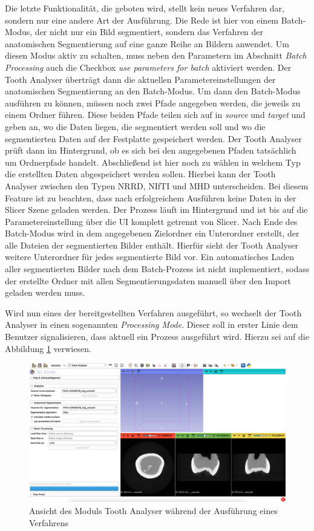 Die letzte Funktionalität, die geboten wird, stellt kein neues Verfahren dar, sondern
nur eine andere Art der Ausführung. Die Rede ist hier von einem Batch-Modus, der
nicht nur ein Bild segmentiert, sondern das Verfahren der anatomischen
Segmentierung auf eine ganze Reihe an Bildern anwendet. Um diesen Modus aktiv zu
schalten, muss neben den Parametern im Abschnitt \textit{Batch Processing} auch die
Checkbox \textit{use parameters for batch} aktiviert werden. Der Tooth Analyser überträgt
dann die aktuellen Parametereinstellungen der anatomischen Segmentierung an den Batch-Modus.
Um dann den Batch-Modus ausführen zu können, müssen noch zwei Pfade angegeben werden,
die jeweils zu einem Ordner führen. Diese beiden Pfade teilen sich auf in \textit{source}
und \textit{target} und geben an, wo die Daten liegen, die segmentiert werden soll
und wo die segmentierten Daten auf der Festplatte gespeichert werden. Der Tooth
Analyser prüft dann im Hintergrund, ob es sich bei den angegebenen Pfaden tatsächlich
um Ordnerpfade handelt. Abschließend ist hier noch zu wählen in welchem Typ die
erstellten Daten abgespeichert werden sollen. Hierbei kann der Tooth Analyser zwischen
den Typen \ac{NRRD}, \ac{NIfTI} und \ac{MHD} unterscheiden. Bei diesem Feature
ist zu beachten, dass nach erfolgreichem Ausführen keine Daten in der Slicer Szene
geladen werden. Der Prozess läuft im Hintergrund und ist bis auf die
Parametereinstellung über die \ac{UI} komplett getrennt von Slicer. Nach Ende
des Batch-Modus wird in dem angegebenen Zielordner ein Unterordner erstellt, der
alle Dateien der segmentierten Bilder enthält. Hierfür sieht der Tooth Analyser
weitere Unterordner für jedes segmentierte Bild vor. Ein automatisches Laden aller
segmentierten Bilder nach dem Batch-Prozess ist nicht implementiert, sodass der
erstellte Ordner mit allen Segmentierungsdaten manuell über den Import geladen
werden muss.

Wird nun eines der bereitgestellten Verfahren ausgeführt, so wechselt der Tooth Analyser
in einen sogenannten \textit{Processing Mode}. Dieser soll in erster Linie dem Benutzer
signalisieren, dass aktuell ein Prozess ausgeführt wird. Hierzu sei auf die Abbildung
\ref{fig:processing_mode} verwiesen.

\begin{figure}[h]
	\centering
	\includegraphics[scale=1, width=\textwidth]{img/processingMode.png}
	\caption{Ansicht des Moduls Tooth Analyser während der Ausführung eines
	Verfahrens}
	\label{fig:processing_mode}
\end{figure}

